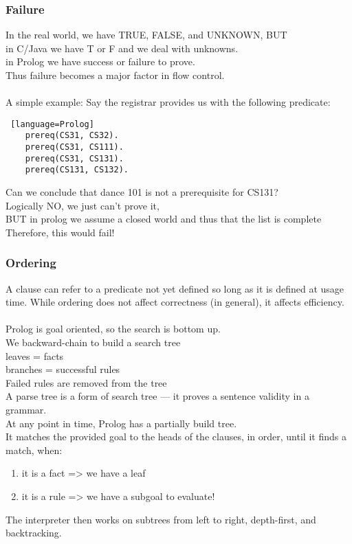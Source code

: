 \documentclass[../../lecture_notes.tex]{subfiles}
\begin{document}
\subsubsection*{Failure}
\noindent In the real world, we have TRUE, FALSE, and UNKNOWN, BUT\\
	\indent in C/Java we have T or F and we deal with unknowns.\\
	\indent in Prolog we have success or failure to prove.\\
Thus failure becomes a major factor in flow control.\\
\\
A simple example:
\indent Say the registrar provides us with the following predicate:
\begin{lstlisting} [language=Prolog]
	prereq(CS31, CS32).
 	prereq(CS31, CS111).
 	prereq(CS31, CS131).
 	prereq(CS131, CS132).
\end{lstlisting}
Can we conclude that dance 101 is not a prerequisite for CS131?\\
	\indent Logically NO, we just can’t prove it,\\
	\indent BUT in prolog we assume a closed world and thus that the list is complete\\
	\indent Therefore, this would fail!

\subsubsection*{Ordering}
\noindent A clause can refer to a predicate not yet defined so long as it is defined at usage time.
While ordering does not affect correctness (in general), it affects efficiency.\\
\\
Prolog is goal oriented, so the search is bottom up.\\
We backward-chain to build a search tree\\
	\indent leaves = facts\\
	\indent branches = successful rules\\
Failed rules are removed from the tree\\
A parse tree is a form of search tree — it proves a sentence validity in a grammar.\\

At any point in time, Prolog has a partially build tree.\\
It matches the provided goal to the heads of the clauses, in order, until it finds a match, when:
\begin{enumerate} [itemsep=0mm]
	\item it is a fact => we have a leaf
	\item it is a rule => we have a subgoal to evaluate!
\end{enumerate}
The interpreter then works on subtrees from left to right, depth-first, and backtracking.\\
\end{document}
